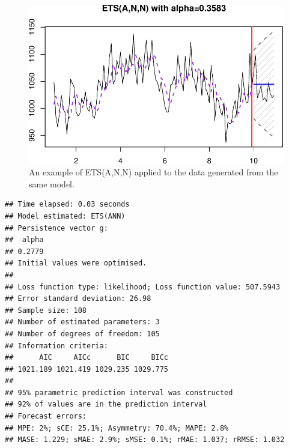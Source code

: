 \documentclass[
]{book}
\newenvironment{Shaded}{\begin{snugshade}}{\end{snugshade}}
\newcommand{\AttributeTok}[1]{\textcolor[rgb]{0.77,0.63,0.00}{#1}}
\newcommand{\CommentTok}[1]{\textcolor[rgb]{0.56,0.35,0.01}{\textit{#1}}}
\newcommand{\ConstantTok}[1]{\textcolor[rgb]{0.00,0.00,0.00}{#1}}
\newcommand{\DecValTok}[1]{\textcolor[rgb]{0.00,0.00,0.81}{#1}}
\newcommand{\FloatTok}[1]{\textcolor[rgb]{0.00,0.00,0.81}{#1}}
\newcommand{\FunctionTok}[1]{\textcolor[rgb]{0.00,0.00,0.00}{#1}}
\newcommand{\NormalTok}[1]{#1}
\newcommand{\OtherTok}[1]{\textcolor[rgb]{0.56,0.35,0.01}{#1}}
\newcommand{\SpecialCharTok}[1]{\textcolor[rgb]{0.00,0.00,0.00}{#1}}
\newcommand{\StringTok}[1]{\textcolor[rgb]{0.31,0.60,0.02}{#1}}
\theoremstyle{definition}
\theoremstyle{definition}
\theoremstyle{definition}
\theoremstyle{definition}
\theoremstyle{remark}
\begin{document}
\begin{Shaded}
\end{Shaded}

\begin{figure}
\centering
\includegraphics{Svetunkov--2022----ADAM_files/figure-latex/ETSANNExample-1.pdf}
\caption{\label{fig:ETSANNExample}An example of ETS(A,N,N) applied to the data generated from the same model.}
\end{figure}

\begin{verbatim}
## Time elapsed: 0.03 seconds
## Model estimated: ETS(ANN)
## Persistence vector g:
##  alpha 
## 0.2779 
## Initial values were optimised.
## 
## Loss function type: likelihood; Loss function value: 507.5943
## Error standard deviation: 26.98
## Sample size: 108
## Number of estimated parameters: 3
## Number of degrees of freedom: 105
## Information criteria:
##      AIC     AICc      BIC     BICc 
## 1021.189 1021.419 1029.235 1029.775 
## 
## 95% parametric prediction interval was constructed
## 92% of values are in the prediction interval
## Forecast errors:
## MPE: 2%; sCE: 25.1%; Asymmetry: 70.4%; MAPE: 2.8%
## MASE: 1.229; sMAE: 2.9%; sMSE: 0.1%; rMAE: 1.037; rRMSE: 1.032
\end{verbatim}
\end{document}
